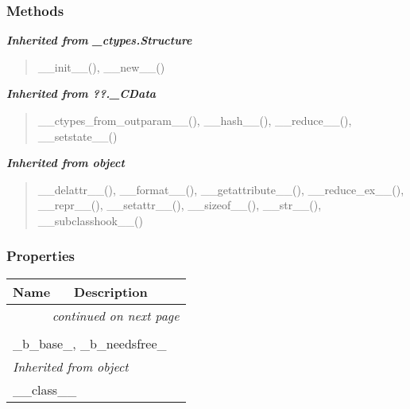 
  \subsubsection{Methods}


\large{\textbf{\textit{Inherited from \_ctypes.Structure}}}

\begin{quote}
\_\_init\_\_(), \_\_new\_\_()
\end{quote}

\large{\textbf{\textit{Inherited from ??.\_CData}}}

\begin{quote}
\_\_ctypes\_from\_outparam\_\_(), \_\_hash\_\_(), \_\_reduce\_\_(), \_\_setstate\_\_()
\end{quote}

\large{\textbf{\textit{Inherited from object}}}

\begin{quote}
\_\_delattr\_\_(), \_\_format\_\_(), \_\_getattribute\_\_(), \_\_reduce\_ex\_\_(), \_\_repr\_\_(), \_\_setattr\_\_(), \_\_sizeof\_\_(), \_\_str\_\_(), \_\_subclasshook\_\_()
\end{quote}


  \subsubsection{Properties}

    \vspace{-1cm}
\hspace{\varindent}\begin{longtable}{|p{\varnamewidth}|p{\vardescrwidth}|l}
\cline{1-2}
\cline{1-2} \centering \textbf{Name} & \centering \textbf{Description}& \\
\cline{1-2}
\endhead\cline{1-2}\multicolumn{3}{r}{\small\textit{continued on next page}}\\\endfoot\cline{1-2}
\endlastfoot\multicolumn{2}{|l|}{\textit{Inherited from ??.\_CData}}\\
\multicolumn{2}{|p{\varwidth}|}{\raggedright \_b\_base\_, \_b\_needsfree\_}\\
\cline{1-2}
\multicolumn{2}{|l|}{\textit{Inherited from object}}\\
\multicolumn{2}{|p{\varwidth}|}{\raggedright \_\_class\_\_}\\
\cline{1-2}
\end{longtable}


